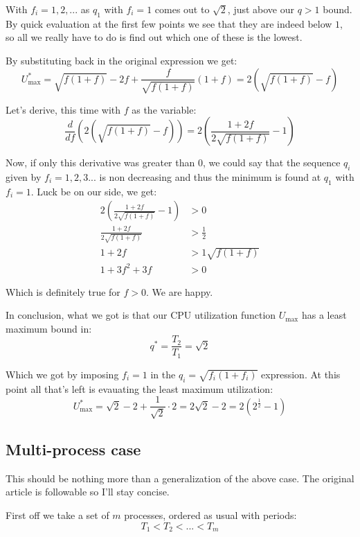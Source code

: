 \documentclass[a4paper,11pt]{article}
\begin{document}
With $f_i = 1, 2, ...$ as $q_1$ with $f_i = 1$ comes out to $\sqrt{2}$, just above our $q > 1$ bound.
By quick evaluation at the first few points we see that they are indeed below $1$, so all we really have to do is find out which one of these is the lowest.

By substituting back in the original expression we get:
$$
	U_\text{max}^* = \sqrt{f(1 + f)} - 2f + \frac{f}{\sqrt{f(1 + f)}} (1 + f) = 2 \left( \sqrt{f(1 + f)} - f\right)
$$

Let's derive, this time with $f$ as the variable:
$$
	\frac{d}{df} \left( 2 \left( \sqrt{f(1 + f)} - f\right) \right) = 2 \left( \frac{1 + 2f}{2 \sqrt{f(1 + f)}} - 1 \right)
$$

Now, if only this derivative was greater than $0$, we could say that the sequence $q_i$ given by $f_i = 1, 2, 3...$ is non decreasing and thus the minimum is found at $q_1$ with $f_i = 1$.
Luck be on our side, we get:
$$
	\begin{aligned}
		2 \left( \frac{1 + 2f}{2 \sqrt{f(1 + f)}} - 1 \right) & > 0                  \\
		\frac{1 + 2f}{2 \sqrt{f(1 + f)}}                      & > \frac{1}{2}        \\
		1 + 2f                                                & > 1 \sqrt{f (1 + f)} \\
		1 + 3 f ^2 + 3 f                                      & > 0
	\end{aligned}
$$

Which is definitely true for $f > 0$.
We are happy.

In conclusion, what we got is that our CPU utilization function $U_\text{max}$ has a least maximum bound in:
$$
	q^* = \frac{T_2}{T_1} = \sqrt{2}
$$

Which we got by imposing $f_i = 1$ in the $q_i = \sqrt{f_i(1 + f_i)}$ expression.
At this point all that's left is evauating the least maximum utilization:
$$
	U_\text{max}^* = \sqrt{2} - 2 + \frac{1}{\sqrt{2}} \cdot 2 = 2 \sqrt{2} - 2 = 2(2^{\frac{1}{2}} - 1)
$$

\subsection{Multi-process case}

This should be nothing more than a generalization of the above case.
The original article is followable so I'll stay concise.

First off we take a set of $m$ processes, ordered as usual with periods:
$$
	T_1 < T_2 < ... < T_m
$$
\end{document}
